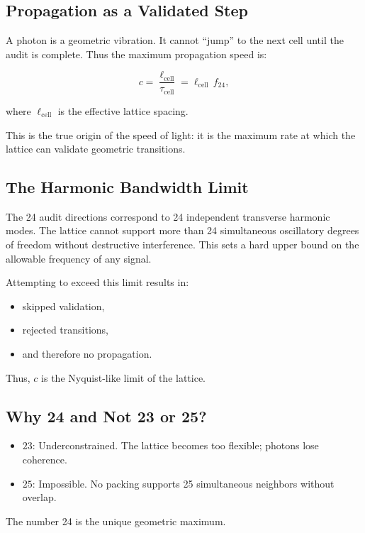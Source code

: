 \documentclass[12pt,oneside]{book}
\begin{document}
\subsection{Propagation as a Validated Step}

A photon is a geometric vibration. It cannot ``jump'' to the next cell until the audit is
complete. Thus the maximum propagation speed is:


\[
c = \frac{\ell_{\text{cell}}}{\tau_{\text{cell}}}
= \ell_{\text{cell}}\, f_{24},
\]


where \(\ell_{\text{cell}}\) is the effective lattice spacing.

This is the true origin of the speed of light: it is the maximum rate at which the lattice
can validate geometric transitions.

\subsection{The Harmonic Bandwidth Limit}

The 24 audit directions correspond to 24 independent transverse harmonic modes. The
lattice cannot support more than 24 simultaneous oscillatory degrees of freedom without
destructive interference. This sets a hard upper bound on the allowable frequency of any
signal.

Attempting to exceed this limit results in:
\begin{itemize}
    \item skipped validation,
    \item rejected transitions,
    \item and therefore no propagation.
\end{itemize}

Thus, \(c\) is the Nyquist-like limit of the lattice.

\subsection{Why 24 and Not 23 or 25?}

\begin{itemize}
    \item \(23\): Underconstrained. The lattice becomes too flexible; photons lose coherence.
    \item \(25\): Impossible. No packing supports 25 simultaneous neighbors without overlap.
\end{itemize}

The number 24 is the unique geometric maximum.
\end{document}

